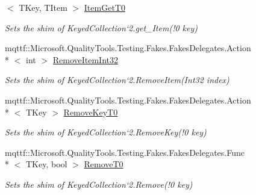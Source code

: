 \begin{DoxyCompactItemize}
$<$ T\-Key, T\-Item $>$ \hyperlink{class_system_1_1_collections_1_1_object_model_1_1_fakes_1_1_shim_keyed_collection_3_01_t_key_00_01_t_item_01_4_a86b00aa849942f8ab1bfb01291b2b18e}{Item\-Get\-T0}
\begin{DoxyCompactList}\small\item\em Sets the shim of Keyed\-Collection`2.get\-\_\-\-Item(!0 key)\end{DoxyCompactList}\item 
mqttf\-::\-Microsoft.\-Quality\-Tools.\-Testing.\-Fakes.\-Fakes\-Delegates.\-Action\\*
$<$ int $>$ \hyperlink{class_system_1_1_collections_1_1_object_model_1_1_fakes_1_1_shim_keyed_collection_3_01_t_key_00_01_t_item_01_4_a4a47c0dc34ef0089e73c3f8644eafb9c}{Remove\-Item\-Int32}
\begin{DoxyCompactList}\small\item\em Sets the shim of Keyed\-Collection`2.Remove\-Item(\-Int32 index)\end{DoxyCompactList}\item 
mqttf\-::\-Microsoft.\-Quality\-Tools.\-Testing.\-Fakes.\-Fakes\-Delegates.\-Action\\*
$<$ T\-Key $>$ \hyperlink{class_system_1_1_collections_1_1_object_model_1_1_fakes_1_1_shim_keyed_collection_3_01_t_key_00_01_t_item_01_4_ac1a69ab8c5aec0d4ec381e35c606803e}{Remove\-Key\-T0}
\begin{DoxyCompactList}\small\item\em Sets the shim of Keyed\-Collection`2.Remove\-Key(!0 key)\end{DoxyCompactList}\item 
mqttf\-::\-Microsoft.\-Quality\-Tools.\-Testing.\-Fakes.\-Fakes\-Delegates.\-Func\\*
$<$ T\-Key, bool $>$ \hyperlink{class_system_1_1_collections_1_1_object_model_1_1_fakes_1_1_shim_keyed_collection_3_01_t_key_00_01_t_item_01_4_ab1f4b19676c14836f2c8358dedbb98b6}{Remove\-T0}
\begin{DoxyCompactList}\small\item\em Sets the shim of Keyed\-Collection`2.Remove(!0 key)\end{DoxyCompactList}\item 

\end{DoxyCompactItemize}

